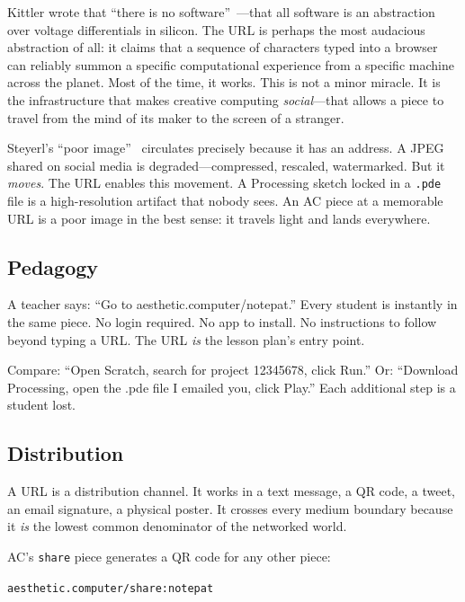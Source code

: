 \documentclass[10pt,letterpaper,twocolumn]{article}
\newcommand{\code}[1]{\texttt{#1}}
\begin{document}
Kittler wrote that ``there is no software''~\citep{kittler1995nosoftware}---that all software is an abstraction over voltage differentials in silicon. The URL is perhaps the most audacious abstraction of all: it claims that a sequence of characters typed into a browser can reliably summon a specific computational experience from a specific machine across the planet. Most of the time, it works. This is not a minor miracle. It is the infrastructure that makes creative computing \emph{social}---that allows a piece to travel from the mind of its maker to the screen of a stranger.

Steyerl's ``poor image''~\citep{steyerl2009poorimage} circulates precisely because it has an address. A JPEG shared on social media is degraded---compressed, rescaled, watermarked. But it \emph{moves}. The URL enables this movement. A Processing sketch locked in a \code{.pde} file is a high-resolution artifact that nobody sees. An AC piece at a memorable URL is a poor image in the best sense: it travels light and lands everywhere.

\subsection{Pedagogy}

A teacher says: ``Go to aesthetic.computer/notepat.'' Every student is instantly in the same piece. No login required. No app to install. No instructions to follow beyond typing a URL. The URL \emph{is} the lesson plan's entry point.

Compare: ``Open Scratch, search for project 12345678, click Run.'' Or: ``Download Processing, open the .pde file I emailed you, click Play.'' Each additional step is a student lost.

\subsection{Distribution}

A URL is a distribution channel. It works in a text message, a QR code, a tweet, an email signature, a physical poster. It crosses every medium boundary because it \emph{is} the lowest common denominator of the networked world.

AC's \code{share} piece generates a QR code for any other piece:

\begin{center}
\code{aesthetic.computer/share:notepat}
\end{center}
\end{document}

